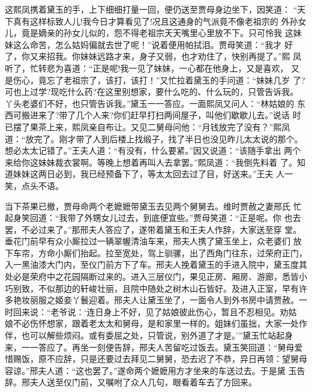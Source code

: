 这熙凤携着黛玉的手，上下细细打量一回，便仍送至贾母身边坐下，因笑道：
“天下真有这样标致人儿!我今日才算看见了!况且这通身的气派竟不像老祖宗的
外孙女儿，竟是嫡亲的孙女儿似的，怨不得老祖宗天天嘴里心里放不下。只可怜我
这妹妹这么命苦，怎么姑妈偏就去世了呢！”说着便用帕拭泪。贾母笑道：“我才
好了，你又来招我。你妹妹远路才来，身子又弱，也才劝住了，快别再提了。”熙
凤听了，忙转悲为喜道：“正是呢!我一见了妹妹，一心都在他身上，又是喜欢，
又是伤心，竟忘了老祖宗了，该打，该打！”又忙拉着黛玉的手问道：“妹妹几岁
了?可也上过学?现吃什么药?在这里别想家，要什么吃的、什么玩的，只管告诉我。
丫头老婆们不好，也只管告诉我。”黛玉一一答应。一面熙凤又问人：“林姑娘的
东西可搬进来了?带了几个人来?你们赶早打扫两间屋子，叫他们歇歇儿去。”说话
时已摆了果茶上来，熙凤亲自布让。又见二舅母问他：“月钱放完了没有？”熙凤
道：“放完了。刚才带了人到后楼上找缎子，找了半日也没见昨儿太太说的那个。
想必太太记错了。”王夫人道：“有没有，什么要紧。”因又说道：“该随手拿出
两个来给你这妹妹裁衣裳啊。等晚上想着再叫人去拿罢。”熙凤道：“我倒先料着
了。知道妹妹这两日必到，我已经预备下了，等太太回去过了目，好送来。”王夫
人一笑，点头不语。

当下茶果已撤，贾母命两个老嬷嬷带黛玉去见两个舅舅去。维时贾赦之妻邢氏
忙起身笑回道：“我带了外甥女儿过去，到底便宜些。”贾母笑道：“正是呢。你
也去罢，不必过来了。”那邢夫人答应了，遂带着黛玉和王夫人作辞，大家送至穿
堂。垂花门前早有众小厮拉过一辆翠幄清油车来，邢夫人携了黛玉坐上，众老婆们
放下车帘，方命小厮们抬起。拉至宽处，驾上驯骡，出了西角门往东，过荣府正门，
入一黑油漆大门内，至仪门前方下了车。邢夫人挽着黛玉的手进入院中，黛玉度其
处必是荣府中之花园隔断过来的。进入三层仪门，果见正房、厢房、游廊，悉皆小
巧别致，不似那边的轩峻壮丽，且院中随处之树木山石皆好。及进入正室，早有许
多艳妆丽服之姬妾丫鬟迎着。邢夫人让黛玉坐了，一面令人到外书房中请贾赦。一
时回来说：“老爷说：‘连日身上不好，见了姑娘彼此伤心，暂且不忍相见。劝姑
娘不必伤怀想家，跟着老太太和舅母，是和家里一样的。姐妹们虽拙，大家一处作
伴，也可以解些烦闷。或有委屈之处，只管说，别外道了才是。’”黛玉忙站起身
来，一一答应了。再坐一刻便告辞，邢夫人苦留吃过饭去。黛玉笑回道：“舅母爱
惜赐饭，原不应辞，只是还要过去拜见二舅舅，恐去迟了不恭，异日再领：望舅母
容谅。”邢夫人道：“这也罢了。”遂命两个嬷嬷用方才坐来的车送过去。于是黛
玉告辞。邢夫人送至仪门前，又嘱咐了众人几句，眼看着车去了方回来。

